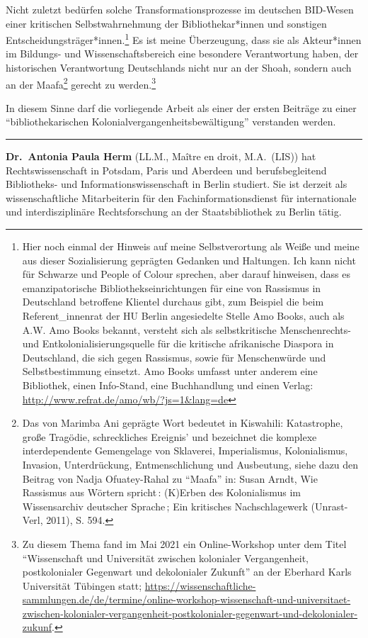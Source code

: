 \documentclass[a4paper,
fontsize=11pt,
oneside,
numbers=noperiodatend,
parskip=half-,
bibliography=totoc,
final
]{scrartcl}
\begin{document}
Nicht zuletzt bedürfen solche Transformationsprozesse im deutschen
BID-Wesen einer kritischen Selbstwahrnehmung der Bibliothekar*innen und
sonstigen Entscheidungsträger*innen.\footnote{Hier noch einmal der
  Hinweis auf meine Selbstverortung als Weiße und meine aus dieser
  Sozialisierung geprägten Gedanken und Haltungen. Ich kann nicht für
  Schwarze und People of Colour sprechen, aber darauf hinweisen, dass es
  emanzipatorische Bibliothekseinrichtungen für eine von Rassismus in
  Deutschland betroffene Klientel durchaus gibt, zum Beispiel die beim
  Referent\_innenrat der HU Berlin angesiedelte Stelle Amo Books, auch
  als A.W. Amo Books bekannt, versteht sich als selbstkritische
  Menschenrechts- und Entkolonialisierungsquelle für die kritische
  afrikanische Diaspora in Deutschland, die sich gegen Rassismus, sowie
  für Menschenwürde und Selbstbestimmung einsetzt. Amo Books umfasst
  unter anderem eine Bibliothek, einen Info-Stand, eine Buchhandlung und
  einen Verlag: \url{http://www.refrat.de/amo/wb/?js=1\&lang=de}} Es ist
meine Überzeugung, dass sie als Akteur*innen im Bildungs- und
Wissenschaftsbereich eine besondere Verantwortung haben, der
historischen Verantwortung Deutschlands nicht nur an der Shoah, sondern
auch an der Maafa\footnote{Das von Marimba Ani geprägte Wort bedeutet in
  Kiswahili: Katastrophe, große Tragödie, schreckliches Ereignis' und
  bezeichnet die komplexe interdependente Gemengelage von Sklaverei,
  Imperialismus, Kolonialismus, Invasion, Unterdrückung,
  Entmenschlichung und Ausbeutung, siehe dazu den Beitrag von Nadja
  Ofuatey-Rahal zu \enquote{Maafa} in: Susan Arndt, Wie Rassismus aus
  Wörtern spricht\,: (K)Erben des Kolonialismus im Wissensarchiv
  deutscher Sprache\,; Ein kritisches Nachschlagewerk (Unrast-Verl,
  2011), S. 594.} gerecht zu werden.\footnote{Zu diesem Thema fand im
  Mai 2021 ein Online-Workshop unter dem Titel \enquote{Wissenschaft und
  Universität zwischen kolonialer Vergangenheit, postkolonialer
  Gegenwart und dekolonialer Zukunft} an der Eberhard Karls Universität
  Tübingen statt;
  \url{https://wissenschaftliche-sammlungen.de/de/termine/online-workshop-wissenschaft-und-universitaet-zwischen-kolonialer-vergangenheit-postkolonialer-gegenwart-und-dekolonialer-zukunf}.}

In diesem Sinne darf die vorliegende Arbeit als einer der ersten
Beiträge zu einer \enquote{bibliothekarischen
Kolonialvergangenheitsbewältigung} verstanden werden.

\begin{center}\rule{0.5\linewidth}{0.5pt}\end{center}

\textbf{Dr.~Antonia Paula Herm} (LL.M., Maître en droit, M.A.~(LIS)) hat
Rechtswissenschaft in Potsdam, Paris und Aberdeen und berufsbegleitend
Bibliotheks- und Informationswissenschaft in Berlin studiert. Sie ist
derzeit als wissenschaftliche Mitarbeiterin für den
Fachinformationsdienst für internationale und interdisziplinäre
Rechtsforschung an der Staatsbibliothek zu Berlin tätig.
\end{document}
